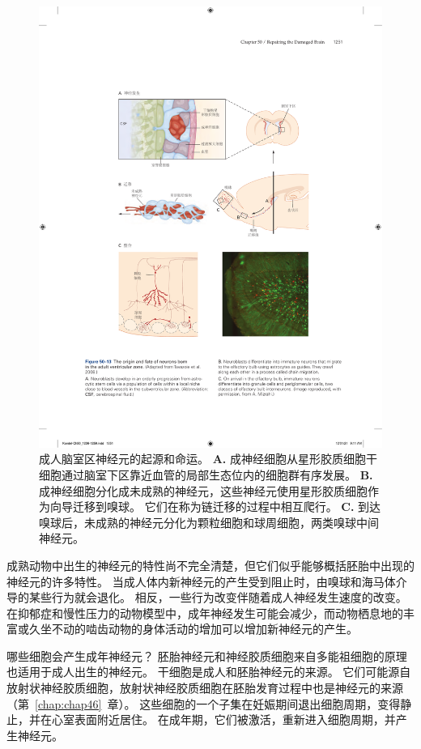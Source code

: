 \begin{figure}[htbp]
	\centering
	\includegraphics[width=0.85\linewidth]{chap50/fig_50_13}
	\caption{成人脑室区神经元的起源和命运\cite{tavazoie2008specialized}。
		\textbf{A.} 成神经细胞从星形胶质细胞干细胞通过脑室下区靠近血管的局部生态位内的细胞群有序发展。
		\textbf{B.} 成神经细胞分化成未成熟的神经元，这些神经元使用星形胶质细胞作为向导迁移到嗅球。
		它们在称为链迁移的过程中相互爬行。
		\textbf{C.} 到达嗅球后，未成熟的神经元分化为颗粒细胞和球周细胞，两类嗅球中间神经元。}
	\label{fig:50_13}
\end{figure}


成熟动物中出生的神经元的特性尚不完全清楚，但它们似乎能够概括胚胎中出现的神经元的许多特性。
当成人体内新神经元的产生受到阻止时，由嗅球和海马体介导的某些行为就会退化。
相反，一些行为改变伴随着成人神经发生速度的改变。
在抑郁症和慢性压力的动物模型中，成年神经发生可能会减少，而动物栖息地的丰富或久坐不动的啮齿动物的身体活动的增加可以增加新神经元的产生。


哪些细胞会产生成年神经元？
胚胎神经元和神经胶质细胞来自多能祖细胞的原理也适用于成人出生的神经元。
干细胞是成人和胚胎神经元的来源。
它们可能源自放射状神经胶质细胞，放射状神经胶质细胞在胚胎发育过程中也是神经元的来源（第~\ref{chap:chap46}~章）。
这些细胞的一个子集在妊娠期间退出细胞周期，变得静止，并在心室表面附近居住。
在成年期，它们被激活，重新进入细胞周期，并产生神经元。


